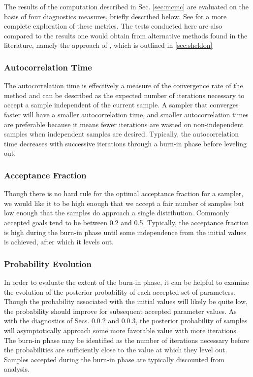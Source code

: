 \documentclass[preprint]{aastex}
\begin{document}
The results of the computation described in Sec. \ref{sec:mcmc} are evaluated on the basis of four diagnostics measures, briefly described below.  See \citet{for12} for a more complete exploration of these metrics.  The tests conducted here are also compared to the results one would obtain from alternative methods found in the literature, namely the approach of \citet{she11}, which is outlined in \ref{sec:sheldon}

\clearpage
\subsubsection{Autocorrelation Time}
\label{sec:acorr}

The autocorrelation time is effectively a measure of the convergence rate of the method and can be described as the expected number of iterations necessary to accept a sample independent of the current sample.  A sampler that converges faster will have a smaller autocorrelation time, and smaller autocorrelation times are preferable because it means fewer iterations are wasted on non-independent samples when independent samples are desired.  Typically, the autocorrelation time decreases with successive iterations through a burn-in phase before leveling out.

\clearpage
\subsubsection{Acceptance Fraction}
\label{sec:afrac}

Though there is no hard rule for the optimal acceptance fraction for a sampler, we would like it to be high enough that we accept a fair number of samples but low enough that the samples do approach a single distribution.  Commonly accepted goals tend to be between 0.2 and 0.5.  Typically, the acceptance fraction is high during the burn-in phase until some independence from the initial values is achieved, after which it levels out.

\clearpage
\subsubsection{Probability Evolution}
\label{sec:probs}

In order to evaluate the extent of the burn-in phase, it can be helpful to examine the evolution of the posterior probability of each accepted set of parameters.  Though the probability associated with the initial values will likely be quite low, the probability should improve for subsequent accepted parameter values.  As with the diagnostics of Secs. \ref{sec:afrac} and \ref{sec:probs}, the posterior probability of samples will asymptotically approach some more favorable value with more iterations.  The burn-in phase may be identified as the number of iterations necessary before the probabilities are sufficiently close to the value at which they level out.  Samples accepted during the burn-in phase are typically discounted from analysis.
\end{document}
